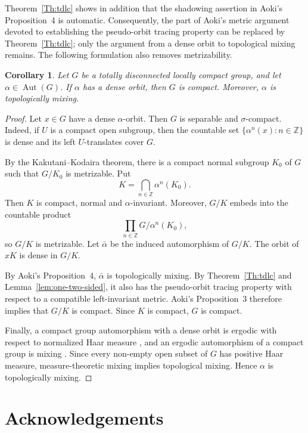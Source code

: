\documentclass[12pt]{amsart}
\newtheorem{corollary}[theorem]{Corollary}
\theoremstyle{definition}
\numberwithin{equation}{section}
\theoremstyle{remark}
\begin{document}
Theorem~\ref{Th:tdlc} shows in addition that the shadowing assertion in
Aoki's Proposition~4 is automatic. Consequently, the part of Aoki's metric
argument devoted to establishing the pseudo-orbit tracing property can be
replaced by Theorem~\ref{Th:tdlc}; only the argument from a dense orbit to
topological mixing remains. The following formulation also removes
metrizability.

\begin{corollary}\label{cor:dense-orbit-compact}
Let $G$ be a totally disconnected locally compact group, and let
$\alpha\in\operatorname{Aut}(G)$. If $\alpha$ has a dense orbit, then $G$
is compact. Moreover, $\alpha$ is topologically mixing.
\end{corollary}

\begin{proof}
Let $x\in G$ have a dense $\alpha$-orbit. Then $G$ is separable and
$\sigma$-compact. Indeed, if $U$ is a compact open subgroup, then the
countable set $\{\alpha^n(x):n\in\mathbb Z\}$ is dense and its left
$U$-translates cover $G$.

By the Kakutani--Kodaira theorem, there is a compact normal subgroup $K_0$
of $G$ such that $G/K_0$ is metrizable. Put
\[
K=\bigcap_{n\in\mathbb Z}\alpha^n(K_0).
\]
Then $K$ is compact, normal and $\alpha$-invariant. Moreover, $G/K$ embeds
into the countable product
\[
\prod_{n\in\mathbb Z}G/\alpha^n(K_0),
\]
so $G/K$ is metrizable. Let $\bar\alpha$ be the induced automorphism of
$G/K$. The orbit of $xK$ is dense in $G/K$.

By Aoki's Proposition~4, $\bar\alpha$ is topologically mixing. By
Theorem~\ref{Th:tdlc} and Lemma~\ref{lem:one-two-sided}, it also has the
pseudo-orbit tracing property with respect to a compatible left-invariant
metric. Aoki's Proposition~3 therefore implies that $G/K$ is compact.
Since $K$ is compact, $G$ is compact.

Finally, a compact group automorphism with a dense orbit is ergodic with
respect to normalized Haar measure \cite{RajagopalanSchreiber1970}, and an
ergodic automorphism of a compact group is mixing
\cite{Yuzvinskii1967}. Since every non-empty open subset of $G$ has
positive Haar measure, measure-theoretic mixing implies topological
mixing. Hence $\alpha$ is topologically mixing.
\end{proof}

\section*{Acknowledgements}
\end{document}
